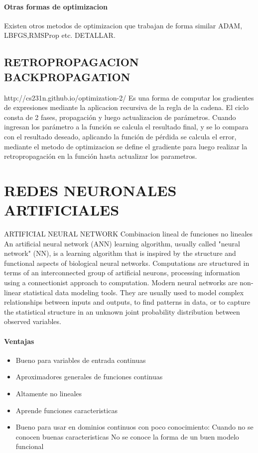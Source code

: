 \documentclass[a4paper,12pt,spanish]{book}
\begin{document}
      \paragraph{Otras formas de optimizacion}
	Existen otros metodos de optimizacion que trabajan de forma similar ADAM, LBFGS,RMSProp etc. DETALLAR.
	
    \subsection{RETROPROPAGACION BACKPROPAGATION}
      http://cs231n.github.io/optimization-2/
      Es una forma  de computar los gradientes de expresiones mediante la aplicacion recursiva de la regla de la cadena.
      El ciclo consta de 2 fases, propagación y luego actualizacion de parámetros. Cuando ingresan los parámetro a la función se calcula el resultado final, y se lo compara con el resultado 
      deseado, aplicando la función de pérdida se calcula el error, mediante el metodo de optimizacion se define el gradiente para luego realizar la retropropagación en la función hasta 
      actualizar los parametros.

    \section{REDES NEURONALES ARTIFICIALES}
      ARTIFICIAL NEURAL NETWORK
      Combinacion lineal de funciones no lineales
      An artificial neural network (ANN) learning algorithm, usually called "neural network" (NN), is a learning algorithm that is inspired by the structure and functional aspects 
      of biological neural networks. Computations are structured in terms of an interconnected group of artificial neurons, processing information using a connectionist approach 
      to computation. Modern neural networks are non-linear statistical data modeling tools. They are usually used to model complex relationships between inputs and outputs, 
      to find patterns in data, or to capture the statistical structure in an unknown joint probability distribution between observed variables.
      \paragraph {Ventajas}
	\begin{itemize}
	  \item Bueno para variables de entrada continuas
	  \item Aproximadores generales de funciones continuas
	  \item Altamente no lineales
	  \item Aprende funciones caracteristicas
	  \item Bueno para usar en dominios continuos con poco conocimiento:
	    \subitem Cuando no se conocen buenas caracteristicas
	    \subitem No se conoce la forma de un buen modelo funcional
	\end{itemize}
\end{document}
